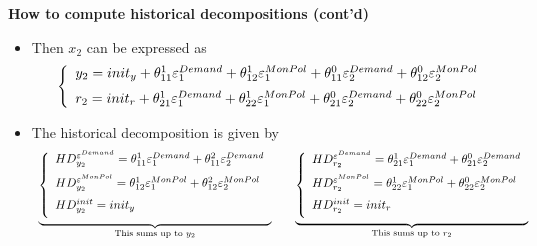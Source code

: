 \documentclass[10pt,english,t,aspectratio=169,ignorenonframetext]{beamer}
\begin{document}

\begin{frame}
{\textbf{How to compute historical decompositions (cont'd)}}\bigskip

\begin{itemize}
\item Then $x_{2}$ can be expressed as 
\begin{equation*}
\left\{ 
\begin{array}{l}
y_{2}=init_{y}+\theta _{11}^{1}\varepsilon _{1}^{Demand}+\theta
_{12}^{1}\varepsilon _{1}^{MonPol}+\theta _{11}^{0}\varepsilon
_{2}^{Demand}+\theta _{12}^{0}\varepsilon _{2}^{MonPol}\medskip \\ 
r_{2}=init_{r}+\theta _{21}^{1}\varepsilon _{1}^{Demand}+\theta
_{22}^{1}\varepsilon _{1}^{MonPol}+\theta _{21}^{0}\varepsilon
_{2}^{Demand}+\theta _{22}^{0}\varepsilon _{2}^{MonPol}%
\end{array}%
\right.
\end{equation*}%
\pause

\item The historical decomposition is given by 
\begin{equation*}
\begin{array}{ccc}
\underset{\text{This sums up to }y_{2}}{\underbrace{\left\{ 
\begin{array}{l}
HD_{y_{2}}^{\varepsilon ^{Demand}}=\theta _{11}^{1}\varepsilon
_{1}^{Demand}+\theta _{11}^{2}\varepsilon _{2}^{Demand}\medskip \\ 
HD_{y_{2}}^{\varepsilon ^{MonPol}}=\theta _{12}^{1}\varepsilon
_{1}^{MonPol}+\theta _{12}^{2}\varepsilon _{2}^{MonPol}\medskip \\ 
HD_{y_{2}}^{init}=init_{y}\medskip%
\end{array}%
\right. }} &  & \underset{\text{This sums up to }r_{2}}{\underbrace{\left\{ 
\begin{array}{l}
HD_{r_{2}}^{\varepsilon ^{Demand}}=\theta _{21}^{1}\varepsilon
_{1}^{Demand}+\theta _{21}^{0}\varepsilon _{2}^{Demand}\medskip \\ 
HD_{r_{2}}^{\varepsilon ^{MonPol}}=\theta _{22}^{1}\varepsilon
_{1}^{MonPol}+\theta _{22}^{0}\varepsilon _{2}^{MonPol}\medskip \\ 
HD_{r_{2}}^{init}=init_{r}\medskip%
\end{array}%
\right. }}%
\end{array}%
\end{equation*}
\end{itemize}
\end{frame}
\end{document}
